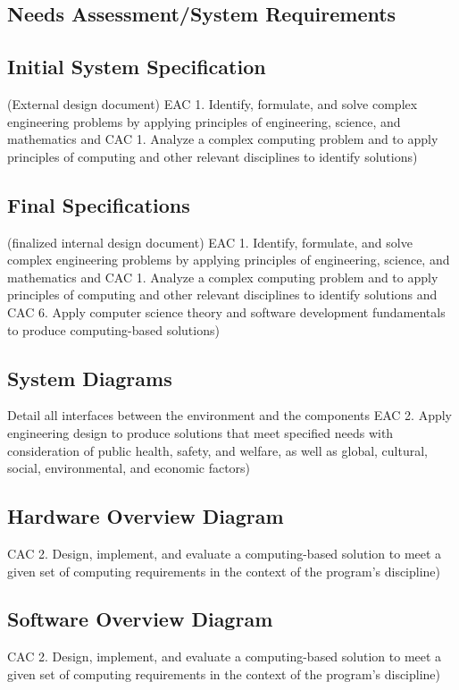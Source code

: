\documentclass{article}
\begin{document}
\subsection{Needs Assessment\slash System Requirements}
\subsection{Initial System Specification}
(External design document) 
    EAC 1. Identify, formulate, and solve complex engineering problems by 
    applying principles of engineering, science, and mathematics and CAC 1. 
    Analyze a complex computing problem and to apply principles of computing 
    and other relevant disciplines to identify solutions) 

\subsection{Final Specifications}
(finalized internal design document) 
    EAC 1. Identify, formulate, and solve complex engineering problems by 
    applying principles of engineering, science, and mathematics and CAC 1. 
    Analyze a complex computing problem and to apply principles of computing 
    and other relevant disciplines to identify solutions and CAC 6. Apply 
    computer science theory and software development fundamentals to produce 
    computing-based solutions) 

\subsection{System Diagrams} 
Detail all interfaces between the environment and the components 
    EAC 2. Apply engineering design to produce solutions that meet specified 
    needs with consideration of public health, safety, and welfare, as well as 
    global, cultural, social, environmental, and economic factors) 

\subsection{Hardware Overview Diagram} 
CAC 2. Design, implement, and evaluate a 
    computing-based solution to meet a given set of computing requirements in 
    the context of the program’s discipline) 

\subsection{Software Overview Diagram} 
CAC 2. Design, implement, and evaluate a 
    computing-based solution to meet a given set of computing requirements in the 
    context of the program’s discipline) 
\end{document}

